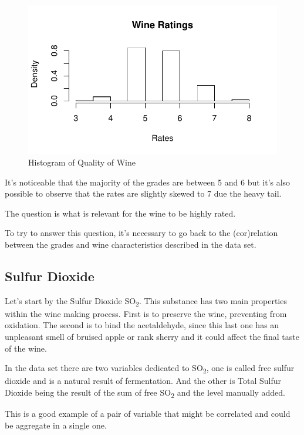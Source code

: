 \documentclass[]{article}
\begin{document}
\begin{figure}[htbp]
\centering
\includegraphics{Project_files/figure-latex/unnamed-chunk-2-1.pdf}
\caption{Histogram of Quality of Wine}
\end{figure}

It's noticeable that the majority of the grades are between 5 and 6 but
it's also possible to observe that the rates are slightly skewed to 7
due the heavy tail.

The question is what is relevant for the wine to be highly rated.

To try to answer this question, it's necessary to go back to the
(cor)relation between the grades and wine characteristics described in
the data set.

\subsection{Sulfur Dioxide}\label{sulfur-dioxide}

Let's start by the Sulfur Dioxide SO\textsubscript{2}. This substance
has two main properties within the wine making process. First is to
preserve the wine, preventing from oxidation. The second is to bind the
acetaldehyde, since this last one has an unpleasant smell of bruised
apple or rank sherry and it could affect the final taste of the wine.
\cite{so2}

In the data set there are two variables dedicated to
SO\textsubscript{2}, one is called free sulfur dioxide and is a natural
result of fermentation. And the other is Total Sulfur Dioxide being the
result of the sum of free SO\textsubscript{2} and the level manually
added.

This is a good example of a pair of variable that might be correlated
and could be aggregate in a single one.
\end{document}
